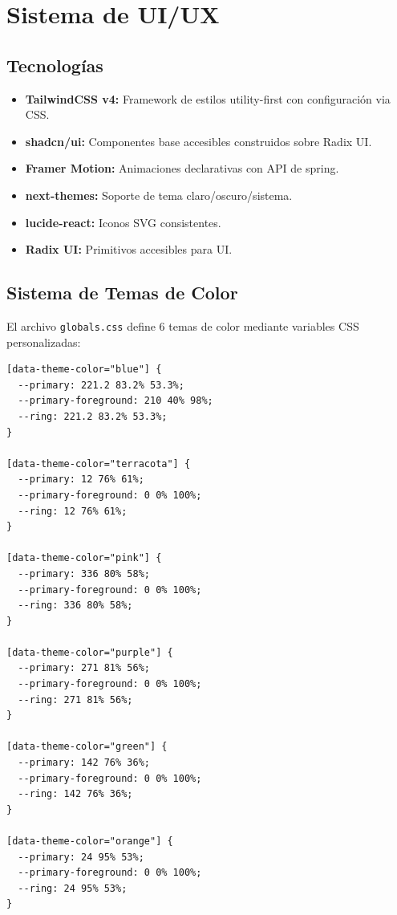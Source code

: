 \chapter{Sistema de UI/UX}

\section{Tecnolog\'ias}

\begin{itemize}[leftmargin=*]
    \item \textbf{TailwindCSS v4:} Framework de estilos utility-first con
          configuraci\'on via CSS.
    \item \textbf{shadcn/ui:} Componentes base accesibles construidos sobre
          Radix UI.
    \item \textbf{Framer Motion:} Animaciones declarativas con API de spring.
    \item \textbf{next-themes:} Soporte de tema claro/oscuro/sistema.
    \item \textbf{lucide-react:} Iconos SVG consistentes.
    \item \textbf{Radix UI:} Primitivos accesibles para UI.
\end{itemize}

\section{Sistema de Temas de Color}

El archivo \texttt{globals.css} define 6 temas de color mediante variables
CSS personalizadas:

\begin{lstlisting}[style=css, caption=Temas de color en CSS]
[data-theme-color="blue"] {
  --primary: 221.2 83.2% 53.3%;
  --primary-foreground: 210 40% 98%;
  --ring: 221.2 83.2% 53.3%;
}

[data-theme-color="terracota"] {
  --primary: 12 76% 61%;
  --primary-foreground: 0 0% 100%;
  --ring: 12 76% 61%;
}

[data-theme-color="pink"] {
  --primary: 336 80% 58%;
  --primary-foreground: 0 0% 100%;
  --ring: 336 80% 58%;
}

[data-theme-color="purple"] {
  --primary: 271 81% 56%;
  --primary-foreground: 0 0% 100%;
  --ring: 271 81% 56%;
}

[data-theme-color="green"] {
  --primary: 142 76% 36%;
  --primary-foreground: 0 0% 100%;
  --ring: 142 76% 36%;
}

[data-theme-color="orange"] {
  --primary: 24 95% 53%;
  --primary-foreground: 0 0% 100%;
  --ring: 24 95% 53%;
}
\end{lstlisting}

